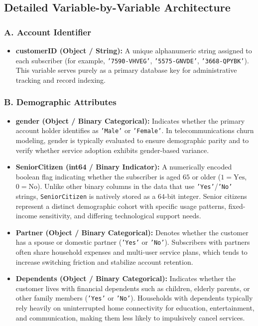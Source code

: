 \subsection{Detailed Variable-by-Variable Architecture}

\subsubsection{A. Account Identifier}
\begin{itemize}
    \item \textbf{customerID (Object / String):} A unique alphanumeric string assigned to each subscriber (for example, \texttt{'7590-VHVEG'}, \texttt{'5575-GNVDE'}, \texttt{'3668-QPYBK'}). This variable serves purely as a primary database key for administrative tracking and record indexing.
\end{itemize}

\subsubsection{B. Demographic Attributes}
\begin{itemize}
    \item \textbf{gender (Object / Binary Categorical):} Indicates whether the primary account holder identifies as \texttt{'Male'} or \texttt{'Female'}. In telecommunications churn modeling, gender is typically evaluated to ensure demographic parity and to verify whether service adoption exhibits gender-based variance.
    \item \textbf{SeniorCitizen (int64 / Binary Indicator):} A numerically encoded boolean flag indicating whether the subscriber is aged $65$ or older ($1 = \text{Yes}$, $0 = \text{No}$). Unlike other binary columns in the data that use \texttt{'Yes'}/\texttt{'No'} strings, \texttt{SeniorCitizen} is natively stored as a $64$-bit integer. Senior citizens represent a distinct demographic cohort with specific usage patterns, fixed-income sensitivity, and differing technological support needs.
    \item \textbf{Partner (Object / Binary Categorical):} Denotes whether the customer has a spouse or domestic partner (\texttt{'Yes'} or \texttt{'No'}). Subscribers with partners often share household expenses and multi-user service plans, which tends to increase switching friction and stabilize account retention.
    \item \textbf{Dependents (Object / Binary Categorical):} Indicates whether the customer lives with financial dependents such as children, elderly parents, or other family members (\texttt{'Yes'} or \texttt{'No'}). Households with dependents typically rely heavily on uninterrupted home connectivity for education, entertainment, and communication, making them less likely to impulsively cancel services.
\end{itemize}

